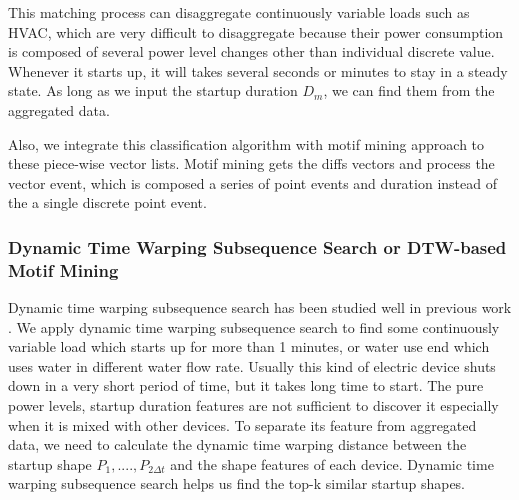 This matching process can disaggregate 
continuously variable loads such as HVAC, 
which are very difficult to disaggregate because 
their power consumption is composed of several power level changes 
other than individual discrete value. 
Whenever it starts up, it will takes several seconds or minutes to stay in a 
steady state. 
As long as we input the startup duration $D_m$, 
we can find them from the aggregated data. 

Also, we integrate this classification algorithm with motif mining approach to these piece-wise vector lists.
Motif mining gets the diffs vectors and 
process the vector event, which is composed a series of point events and duration instead of the a single discrete point event. 

\subsubsection{Dynamic Time Warping Subsequence Search or DTW-based Motif Mining}
Dynamic time warping subsequence search has been studied well in previous work \cite{rakthanmanon2012searching}.
We apply dynamic time warping subsequence search to find some continuously variable load which 
starts up for more than 1 minutes, or water use end which uses water in different water flow rate. 
Usually this kind of electric device shuts down in a very short period of time, 
but it takes long time to start. 
The pure power levels, startup duration features are not sufficient to 
discover it especially when it is mixed with other devices. 
To separate its feature from aggregated data, 
we need to calculate the dynamic time warping distance between the startup shape $P_1, ...., P_{2\Delta t}$ and the 
shape features of each device. 
Dynamic time warping subsequence search helps us find the top-k similar startup shapes.


